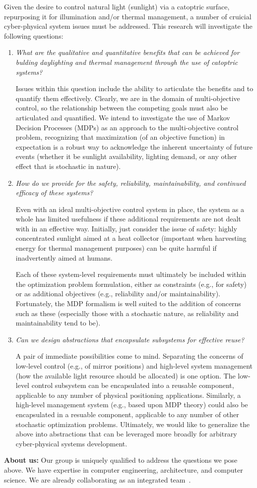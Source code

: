 Given the desire to control natural light (sunlight) via a catoptric surface,
repurposing it for illumination and/or thermal management, a number of
cruicial cyber-physical system issues must be addressed.
This research will investigate the following questions:
\begin{enumerate}

\item \emph{What are the qualitative and quantitative benefits
that can be achieved for bulding daylighting and thermal management
through the use of catoptric systems?}

Issues within this question include the ability to articulate the benefits
and to quantify them effectively.  Clearly, we are in the domain
of multi-objective control, so the relationship between the competing
goals must also be articulated and quantified. We intend to investigate
the use of Markov Decision Processes (MDPs) as an approach to
the multi-objective control problem, recognizing that maximization
(of an objective function) in expectation is a robust way to acknowledge
the inherent uncertainty of future events (whether it be sunlight availability,
lighting demand, or any other effect that is stochastic in nature).

\item \emph{How do we provide for the safety, reliability, maintainability, and
continued efficacy of these systems?}

Even with an ideal multi-objective control system in place, the system as
a whole has limited usefulness if these additional requirements are not
dealt with in an effective way.  Initially, just consider the issue of
safety: highly concentrated sunlight aimed at a heat collector (important
when harvesting energy for thermal management purposes) can be quite harmful
if inadvertently aimed at humans. 

Each of these system-level requirements must ultimately be included within
the optimization problem formulation, either as constraints (e.g., for
safety) or as additional objectives (e.g., reliability and/or maintainability).
Fortunately, the MDP formalism is well suited to the addition of concerns
such as these (especially those with a stochastic nature, as reliability
and maintainability tend to be).

\item \emph{Can we design abstractions that encapsulate subsystems for
effective reuse?}

A pair of immediate possibilities come to mind. Separating the concerns
of low-level control (e.g., of mirror positions) and high-level system
management (how the available light resource should be allocated) is one
option.  The low-level control subsystem can be encapsulated into a reusable
component, applicable to any number of physical positioning applications.
Similarly, a high-level management system (e.g., based upon MDP theory)
could also be encapsulated in a resuable component, applicable to any
number of other stochastic optimization problems.
Ultimately, we would like to generalize the above into abstractions that can be
leveraged more broadly for arbitrary cyber-physical systems development.

\end{enumerate}

\noindent
{\bf About us:}
Our group is uniquely qualified to address the questions we pose above.
We have expertise in computer engineering, architecture, and computer
science. We are already collaborating as an integrated team~\cite{cag18}.
